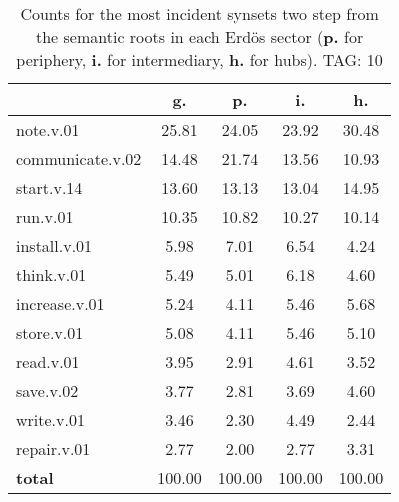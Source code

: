 \begin{table}[h!]
\begin{center}
\begin{tabular}{| l || c | c | c | c |}\hline
 & {\bf g.} & {\bf p.} & {\bf i.} & {\bf h.} \\\hline\hline
note.v.01 & 25.81  & 24.05  & 23.92  & 30.48 \\\hline
communicate.v.02 & 14.48  & 21.74  & 13.56  & 10.93 \\\hline
start.v.14 & 13.60  & 13.13  & 13.04  & 14.95 \\\hline
run.v.01 & 10.35  & 10.82  & 10.27  & 10.14 \\\hline
install.v.01 & 5.98  & 7.01  & 6.54  & 4.24 \\\hline
think.v.01 & 5.49  & 5.01  & 6.18  & 4.60 \\\hline
increase.v.01 & 5.24  & 4.11  & 5.46  & 5.68 \\\hline
store.v.01 & 5.08  & 4.11  & 5.46  & 5.10 \\\hline
read.v.01 & 3.95  & 2.91  & 4.61  & 3.52 \\\hline
save.v.02 & 3.77  & 2.81  & 3.69  & 4.60 \\\hline
write.v.01 & 3.46  & 2.30  & 4.49  & 2.44 \\\hline
repair.v.01 & 2.77  & 2.00  & 2.77  & 3.31 \\\hline\hline
{{\bf total}} & 100.00  & 100.00  & 100.00  & 100.00 \\\hline
\end{tabular}
\caption{Counts for the most incident synsets two step from the semantic roots in each Erd\"os sector ({\bf p.} for periphery, {\bf i.} for intermediary, {\bf h.} for hubs). TAG: 10}
\end{center}
\end{table}
